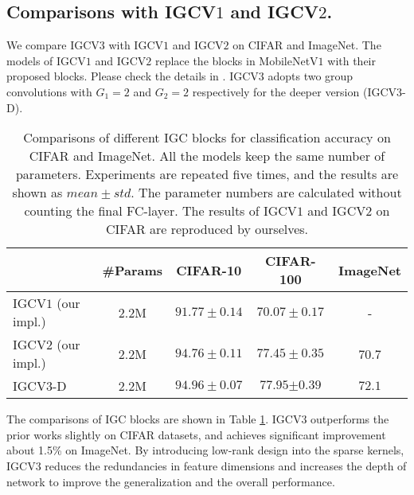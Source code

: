\documentclass{bmvc2k}
\begin{document}
	\subsection{Comparisons with IGCV$1$ and IGCV$2$.}
	We compare IGCV$3$ with IGCV$1$ and IGCV$2$ on CIFAR and ImageNet. The models of IGCV$1$ and IGCV$2$ replace the blocks in MobileNetV$1$ with their proposed blocks. Please check the details in \cite{zhang2017interleaved,ISSC18}. IGCV$3$ adopts two group convolutions with $G_1=2$ and $G_2=2$ respectively for the deeper version (IGCV$3$-D).

	\begin{table}[htb!]
		\begin{center}
			\begin{tabular}{|l||c|c|c|c|}
				\hline
				& \#Params& CIFAR-10 & CIFAR-100& ImageNet\\
				\hline\hline
				IGCV$1$ (our impl.)    & 2.2M  &   $91.77\pm0.14$    & $70.07\pm0.17$& -\\
				IGCV$2$ (our impl.) & 2.2M  & $94.76\pm0.11$ &$77.45\pm0.35$& 70.7  \\
				IGCV$3$-D & 2.2M & $\mathbf{94.96\pm{0.07}}$ &$\mathbf{77.95{\pm0.39}}$&$\mathbf{72.1}$ \\
				\hline
			\end{tabular}
		\end{center}
		\caption{Comparisons of different IGC blocks for classification accuracy on CIFAR and ImageNet. All the models keep the same number of parameters. Experiments are repeated five times, and the results are shown as $mean\pm std$. The parameter numbers are calculated without counting the final FC-layer. The results of IGCV$1$ and IGCV$2$ on CIFAR are reproduced by ourselves.}
		\label{tab:diiff_igc}
	\end{table}

	The comparisons of IGC blocks are shown in Table \ref{tab:diiff_igc}. IGCV$3$ outperforms the prior works slightly on CIFAR datasets, and achieves significant improvement about 1.5\% on ImageNet.
	By introducing low-rank design into the sparse kernels, IGCV$3$ reduces the redundancies in feature dimensions and increases the depth of network to improve the generalization and the overall performance.
\end{document}
